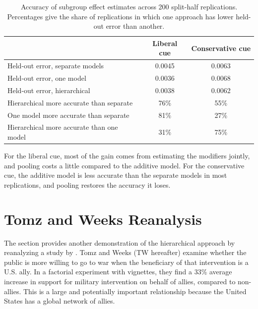 \documentclass[12pt]{article}
\begin{document}
\begin{table}[htpb]
\begin{center}
\begin{tabular}{lcc}
\hline
& Liberal cue & Conservative cue \\
\hline
Held-out error, separate models & 0.0045 & 0.0063 \\
Held-out error, one model & 0.0036 & 0.0068 \\
Held-out error, hierarchical & 0.0038 & 0.0062 \\
Hierarchical more accurate than separate & 76\% & 55\% \\
One model more accurate than separate & 81\% & 27\% \\
Hierarchical more accurate than one model & 31\% & 75\% \\
\hline
\end{tabular}
\caption{Accuracy of subgroup effect estimates across 200 split-half replications. Percentages give the share of replications in which one approach has lower held-out error than another.}
\label{tab:bp-split}
\end{center}
\end{table}

For the liberal cue, most of the gain comes from estimating the modifiers jointly, and pooling costs a little compared to the additive model.
For the conservative cue, the additive model is less accurate than the separate models in most replications, and pooling restores the accuracy it loses.



\newpage

\section{Tomz and Weeks Reanalysis}

The section provides another demonstration of the hierarchical approach by reanalyzing a study by \citet{TomzWeeks2021}. 
Tomz and Weeks (TW hereafter) examine whether the public is more willing to go to war when the beneficiary of that intervention is a U.S. ally.
In a factorial experiment with vignettes, they find a 33\% average increase in support for military intervention on behalf of allies, compared to non-allies. 
This is a large and potentially important relationship because the United States has a global network of allies. 
\end{document}
